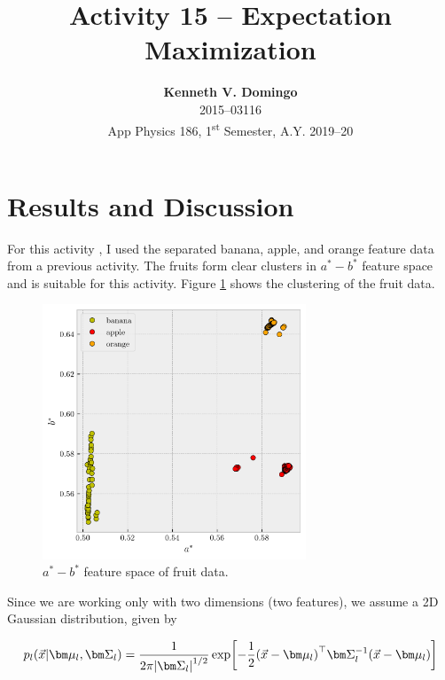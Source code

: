 \documentclass[12pt,a4paper]{article}
\newcommand{\activity}{Activity 15 -- Expectation Maximization}
\begin{document}
\title{\TitleFont \activity}
\author[ ]{\textbf{Kenneth V. Domingo} \\
2015--03116 \\
App Physics 186, 1\textsuperscript{st} Semester, A.Y. 2019--20}

\maketitle
\thispagestyle{titlestyle}

\section*{Results and Discussion}
\setcounter{section}{1}

For this activity \cite{soriano}, I used the separated banana, apple, and orange feature data from a previous activity. The fruits form clear clusters in $a^*-b^*$ feature space and is suitable for this activity. Figure \ref{fig:ab-space} shows the clustering of the fruit data. 

\begin{figure}[htb]
	\centering
	\includegraphics[width=0.7\textwidth]{ab-space.png}
	\caption{$a^*-b^*$ feature space of fruit data.}
	\label{fig:ab-space}
\end{figure}

Since we are working only with two dimensions (two features), we assume a 2D Gaussian distribution, given by

\begin{equation}
	p_l \qty(\vec{x} | \bm\mu_l, \bm\Sigma_l) = \frac{1}{2\pi \abs{\bm\Sigma_l}^{1/2}} \exp[-\frac{1}{2} \qty(\vec{x} - \bm\mu_l)^\top \bm\Sigma_l^{-1} \qty(\vec{x} - \bm\mu_l)]
\end{equation}
\end{document}
